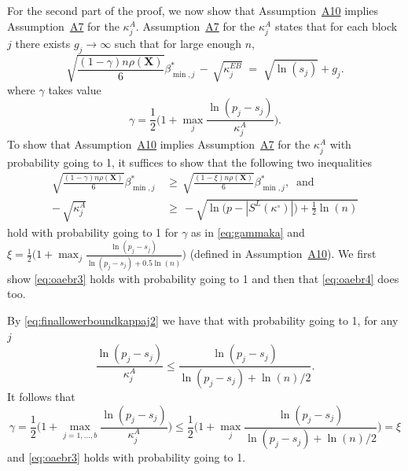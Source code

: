 \documentclass[bj,authoryear]{imsart}
\theoremstyle{plain}
\newcommand{\bs}{\boldsymbol}
\begin{document}
For the second part of the proof,
we now show that Assumption~\hyperlink{lab:A10}{A10} implies Assumption~\hyperlink{lab:A7}{A7} for the $\kappa^{A}_j$. Assumption~\hyperlink{lab:A7}{A7} for the $\kappa_j^{A}$ states that for each block $j$ there exists $g_j\to \infty$ such that for large enough $n$,
    \begin{equation*}
        \sqrt{\frac{(1-\gamma) n\rho(\bs X)}{6}}{{\beta_{\min,j}^*}} \,- \,\sqrt{\kappa^{EB}_j} \;=\; \sqrt{\ln(s_j)} + g_j .
    \end{equation*}
where $\gamma$ takes value
\begin{equation}\label{eq:gammaka}
    \gamma=\frac12\Big(1+\max_j\frac{\ln(p_j-s_j)}{\kappa^{A}_j}\Big).
\end{equation}
To show that Assumption~\hyperlink{lab:A10}{A10} implies Assumption~\hyperlink{lab:A7}{A7} for the $\kappa_j^{A}$ with probability going to 1, it suffices to show that the following two inequalities
\begin{align}
    \sqrt{\frac{ (1-\gamma)n\rho(\bs X)}{6}}{\beta_{\min,j}^*} \,&\geq \,  \sqrt{\frac{ (1-\xi)n\rho(\bs X)}{6}}{\beta_{\min,j}^*}, \label{eq:oaebr3}\;\;\text{and} \\
    - \,\sqrt{\kappa^{A}_j} \,&\geq \,-\sqrt{\ln\bigg(p-|S^{L}(\kappa^{\circ})|\bigg)+\frac12\ln(n)}\label{eq:oaebr4}
\end{align}
hold with probability going to 1 for $\gamma$ as in \eqref{eq:gammaka} and $\xi=\frac12\big(1+\max_j \frac{\ln(p_j-s_j)}{\ln(p_j-s_j)+0.5\ln(n)}\big)$ (defined in Assumption~\hyperlink{lab:A10}{A10}). We first show \eqref{eq:oaebr3} holds with probability going to 1 and then that \eqref{eq:oaebr4} does too.

By \eqref{eq:finallowerboundkappaj2} we have that with probability going to 1, for any $j$
\begin{equation*}
\frac{\ln(p_j-s_j)}{\kappa^{A}_j} 
    \leq  \frac{\ln(p_j-s_j)}{\ln(p_j-s_j)+\ln(n)/2}.
\end{equation*}
It follows that
\begin{equation*}
    \gamma=\frac12\Big(1+\max_{j=1, \ldots,b}\frac{\ln(p_j-s_j)}{\kappa^ A_j}\Big) \leq \frac12\big(1+\max_j \frac{\ln(p_j-s_j)}{\ln(p_j-s_j)+\ln(n)/2}\big)=\xi
\end{equation*}
and \eqref{eq:oaebr3} holds with probability going to 1.
\end{document}
